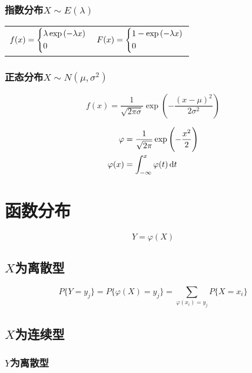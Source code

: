\subsubsection{指数分布$X \sim E(\lambda)$}
\label{ssub:指数分布}

\begin{tabular}{l|r}
    $f(x) =
    \begin{dcases}
        \lambda \exp\left( -\lambda x \right) \\
        0
    \end{dcases} $ &
    $ F(x) =
    \begin{dcases}
        1 - \exp\left( -\lambda x \right) \\
        0
    \end{dcases} $
\end{tabular}

\subsubsection{正态分布$X \sim N(\mu, \sigma^2)$}
\label{ssub:正态分布}
\[
    f(x) = \frac{1}{\sqrt{2\pi\sigma}} \exp\left( - \frac{(x-\mu)^2}{2\sigma^2} \right)
\]

\begin{align}
    \varphi &= \frac{1}{\sqrt{2\pi}} \exp\left( - \frac{x^2}{2} \right) \\
    \varphi(x) &= \int_{-\infty}^x \varphi(t)\dif t
\end{align}

\section{函数分布}
\label{sec:函数分布}

\[
    Y = \varphi(X)
\]

\subsection{$X$为离散型}
\label{sub:_x_为离散型}

\[
    P\{Y = y_j\} = P\{\varphi(X) = y_j\} = \sum_{\varphi(x_i)=y_j} P\{X = x_i\}
\]

\subsection{$X$为连续型}
\label{sub:_x_为连续型}

\subsubsection{$Y$为离散型}
\label{ssub:_y_为离散型}

